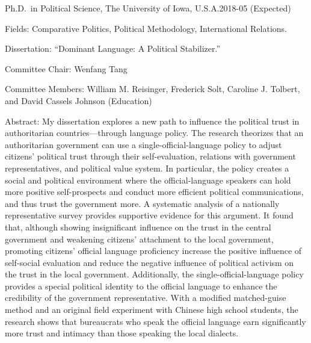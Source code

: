 \documentclass[10.5pt,]{article}
\providecommand{\tightlist}{%
	\setlength{\itemsep}{0pt}\setlength{\parskip}{0pt}}
\renewenvironment{itemize}{
	\begin{list}{}{
			\setlength{\leftmargin}{1.5em}
		}
	}{
	\end{list}
}
\begin{document}
\begin{itemize}
\tightlist
\item
  Ph.D.~in Political Science, The University of Iowa,
  U.S.A.\hfill 2018-05 (Expected)

  \begin{itemize}
  \tightlist
  \item
    \footnotesize Fields: Comparative Politics, Political Methodology,
    International Relations.
  \item
    \footnotesize Dissertation: ``Dominant Language: A Political
    Stabilizer.''

    \begin{itemize}
    \tightlist
    \item
      Committee Chair: Wenfang Tang
    \item
      Committee Members: William M. Reisinger, Frederick Solt, Caroline
      J. Tolbert, and David Cassels Johnson (Education)
    \item
      Abstract: My dissertation explores a new path to influence the
      political trust in authoritarian countries---through language
      policy. The research theorizes that an authoritarian government
      can use a single-official-language policy to adjust citizens'
      political trust through their self-evaluation, relations with
      government representatives, and political value system. In
      particular, the policy creates a social and political environment
      where the official-language speakers can hold more positive
      self-prospects and conduct more efficient political
      communications, and thus trust the government more. A systematic
      analysis of a nationally representative survey provides supportive
      evidence for this argument. It found that, although showing
      insignificant influence on the trust in the central government and
      weakening citizens' attachment to the local government, promoting
      citizens' official language proficiency increase the positive
      influence of self-social evaluation and reduce the negative
      influence of political activism on the trust in the local
      government. Additionally, the single-official-language policy
      provides a special political identity to the official language to
      enhance the credibility of the government representative. With a
      modified matched-guise method and an original field experiment
      with Chinese high school students, the research shows that
      bureaucrats who speak the official language earn significantly
      more trust and intimacy than those speaking the local dialects.

\end{itemize}
\end{itemize}
\end{itemize}
\end{document}
